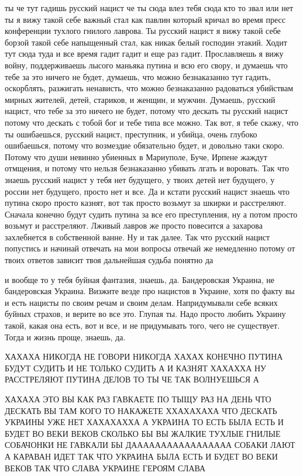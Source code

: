 ты че тут гадишь русский нацист че ты сюда влез тебя сюда кто то звал или нет
ты я вижу такой себе важный стал как павлин который кричал во время пресс
конференции тухлого гнилого лаврова. Ты русский нацист я вижу такой себе борзой
такой себе напыщенный стал, как никак белый господин этакий. Ходит тут сюда
туда и все время гадит гадит и еще раз гадит. Прославляешь я вижу войну,
поддерживаешь лысого маньяка путина и всю его свору, и думаешь что тебе за это
ничего не будет, думаешь, что можно безнаказанно тут гадить, оскорблять,
разжигать ненависть, что можно безнаказанно радоваться убийствам мирных
жителей, детей, стариков, и женщин, и мужчин. Думаешь, русский нацист, что тебе
за это ничего не будет, потому что дескать ты русский нацист потому что дескать
с тобой бог и тебе типа все можно. Так вот, я тебе скажу, что ты ошибаешься,
русский нацист, преступник, и убийца, очень глубоко ошибаешься, потому что
возмездие обязательно будет, и довольно таки скоро. Потому что души невинно
убиенных в Мариуполе, Буче, Ирпене жаждут отмщения, и потому что нельзя
безнаказанно убивать лгать и воровать. Так что знаешь русский нацист у тебя нет
будущего, у твоих детей нет будущего, у россии нет будущего, просто нет и все.
Да и кстати русский нацист знаешь что путина скоро просто казнят, вот так
просто возьмут за шкирки и расстреляют. Сначала конечно будут судить путина за
все его преступления, ну а потом просто возьмут и расстреляют. Лживый лавров же
просто повесится а захарова захлебнется в собственной ванне. Ну и так далее.
Так что русский нацист попустись и начинай отвечать на мои вопросы отвечай же
немедленно потому от твоих ответов зависит твоя дальнейшая судьба понятно да

и вообще то у тебя буйная фантазия, знаешь, да. Бандеровская Украина, не
бандеровская Украина. Визжите везде про нацистов в Украине, хотя по факту вы и
есть нацисты по своим речам и своим делам. Напридумывали себе всяких буйных
страхов, и верите во все это. Глупая ты. Надо просто любить Украину такой,
какая она есть, вот и все, и не придумывать того, чего не существует. Тогда и
жизнь проще, знаешь, да.

ХАХАХА НИКОГДА НЕ ГОВОРИ НИКОГДА ХАХАХ КОНЕЧНО ПУТИНА БУДУТ СУДИТЬ И НЕ ТОЛЬКО
СУДИТЬ А И КАЗНЯТ ХАХАХХА НУ РАССТРЕЛЯЮТ ПУТИНА ДЕЛОВ ТО ТЫ ЧЕ ТАК ВОЛНУЕШЬСЯ А

ХАХАХА ЭТО ВЫ КАК РАЗ ГАВКАЕТЕ ПО ТЫЩУ РАЗ НА ДЕНЬ ЧТО ДЕСКАТЬ ВЫ ТАМ КОГО ТО
НАКАЖЕТЕ ХХАХАХАХА ЧТО ДЕСКАТЬ УКРАИНЫ УЖЕ НЕТ ХАХАХАХХА А УКРАИНА ТО ЕСТЬ БЫЛА
ЕСТЬ И БУДЕТ ВО ВЕКИ ВЕКОВ СКОЛЬКО БЫ ВЫ ЖАЛКИЕ ТУХЛЫЕ ГНИЛЫЕ СОБАЧОНКИ НЕ
ГАВКАЛИ БЫ ДААААААААААААААААА СОБАКИ ЛАЮТ А КАРАВАН ИДЕТ ТАК ЧТО УКРАИНА БЫЛА
ЕСТЬ И БУДЕТ ВО ВЕКИ ВЕКОВ ТАК ЧТО СЛАВА УКРАИНЕ ГЕРОЯМ СЛАВА

